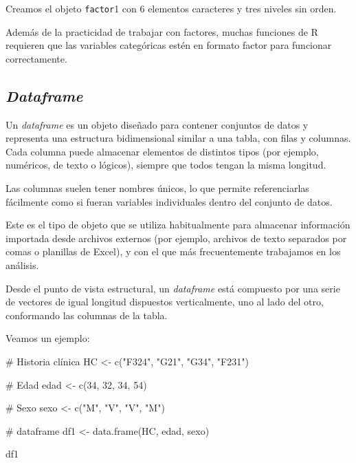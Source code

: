 \documentclass[
  spanish,
  a4paper,
]{scrbook}
\newenvironment{Shaded}{\begin{snugshade}}{\end{snugshade}}
\newcommand{\CommentTok}[1]{\textcolor[rgb]{0.37,0.37,0.37}{#1}}
\newcommand{\DecValTok}[1]{\textcolor[rgb]{0.68,0.00,0.00}{#1}}
\newcommand{\FunctionTok}[1]{\textcolor[rgb]{0.28,0.35,0.67}{#1}}
\newcommand{\NormalTok}[1]{\textcolor[rgb]{0.00,0.23,0.31}{#1}}
\newcommand{\OtherTok}[1]{\textcolor[rgb]{0.00,0.23,0.31}{#1}}
\newcommand{\StringTok}[1]{\textcolor[rgb]{0.13,0.47,0.30}{#1}}
\begin{document}
Creamos el objeto \texttt{factor}1 con 6 elementos caracteres y tres
niveles sin orden.

Además de la practicidad de trabajar con factores, muchas funciones de R
requieren que las variables categóricas estén en formato factor para
funcionar correctamente.

\subsection{\texorpdfstring{\emph{Dataframe}}{Dataframe}}\label{dataframe}

Un \emph{dataframe} es un objeto diseñado para contener conjuntos de
datos y representa una estructura bidimensional similar a una tabla, con
filas y columnas. Cada columna puede almacenar elementos de distintos
tipos (por ejemplo, numéricos, de texto o lógicos), siempre que todos
tengan la misma longitud.

Las columnas suelen tener nombres únicos, lo que permite referenciarlas
fácilmente como si fueran variables individuales dentro del conjunto de
datos.

Este es el tipo de objeto que se utiliza habitualmente para almacenar
información importada desde archivos externos (por ejemplo, archivos de
texto separados por comas o planillas de Excel), y con el que más
frecuentemente trabajamos en los análisis.

Desde el punto de vista estructural, un \emph{dataframe} está compuesto
por una serie de vectores de igual longitud dispuestos verticalmente,
uno al lado del otro, conformando las columnas de la tabla.

Veamos un ejemplo:

\begin{Shaded}
\begin{Highlighting}[]
\CommentTok{\# Historia clínica}
\NormalTok{HC }\OtherTok{\textless{}{-}} \FunctionTok{c}\NormalTok{(}\StringTok{"F324"}\NormalTok{, }\StringTok{"G21"}\NormalTok{, }\StringTok{"G34"}\NormalTok{, }\StringTok{"F231"}\NormalTok{)}

\CommentTok{\# Edad}
\NormalTok{edad }\OtherTok{\textless{}{-}} \FunctionTok{c}\NormalTok{(}\DecValTok{34}\NormalTok{, }\DecValTok{32}\NormalTok{, }\DecValTok{34}\NormalTok{, }\DecValTok{54}\NormalTok{)}

\CommentTok{\# Sexo}
\NormalTok{sexo }\OtherTok{\textless{}{-}} \FunctionTok{c}\NormalTok{(}\StringTok{"M"}\NormalTok{, }\StringTok{"V"}\NormalTok{, }\StringTok{"V"}\NormalTok{, }\StringTok{"M"}\NormalTok{)}

\CommentTok{\# dataframe}
\NormalTok{df1 }\OtherTok{\textless{}{-}} \FunctionTok{data.frame}\NormalTok{(HC, edad, sexo)}

\NormalTok{df1}
\end{Highlighting}
\end{Shaded}
\end{document}
